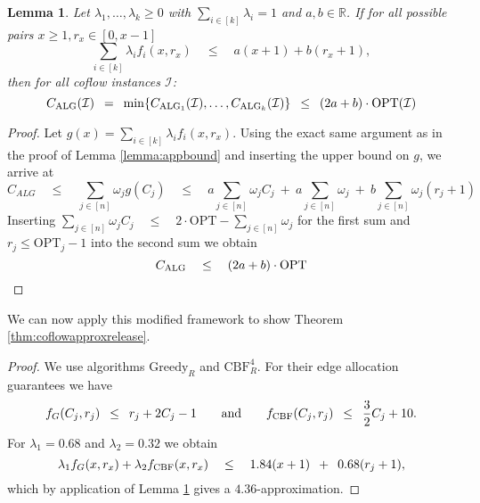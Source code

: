 \documentclass[11pt]{article}
\newcommand{\Hquad}{\hspace{0.5em}}
\newtheorem{lemma}[theorem]{Lemma}
\begin{document}
\begin{lemma}\label{lemma:appboundrelease}
Let $\lambda_1,\dotsc,\lambda_k \ge 0$ with $\sum_{i \in [k]}\lambda_i = 1$ and $a,b \in \mathbb{R}$. If for all possible pairs $x \ge 1, r_x \in [0,x-1]$
\begin{equation*}
    \sum_{i \in [k]}\lambda_i f_i(x, r_x) \quad \le \quad a(x+1) + b(r_x+1),
\end{equation*}
then for all coflow instances $\mathcal{I}$:
\begin{equation*}
    C_{\mathrm{ALG}}(\mathcal{I}) \Hquad=\Hquad \min\{C_{\mathrm{ALG}_1}(\mathcal{I}),\dotsc,C_{\mathrm{ALG}_k}(\mathcal{I})\} \Hquad\le\Hquad (2a + b) \cdot \mathrm{OPT}(\mathcal{I})
\end{equation*}
\end{lemma}
\begin{proof}
Let $g(x) = \sum_{i \in [k]}\lambda_i f_i(x,r_x)$. Using the exact same argument as in the proof of Lemma \ref{lemma:appbound} and inserting the upper bound on $g$, we arrive at
\begin{equation*}
    C_{ALG} \quad \le \quad \sum_{j \in [n]}\omega_j g(C_j) \quad \le \quad a \sum_{j \in [n]}\omega_j C_j \ +\  a\sum_{j \in [n]}\omega_j \ +\  b \sum_{j \in [n]}\omega_j(r_j+1)
\end{equation*}
Inserting $\sum_{j \in [n]}\omega_j C_j \quad \le \quad 2 \cdot \mathrm{OPT} - \sum_{j \in [n]}\omega_j$ for the first sum and $r_j \le \mathrm{OPT}_j-1$ into the second sum we obtain
\begin{equation*}
C_{\mathrm{ALG}} \quad \le \quad (2a+b) \cdot \mathrm{OPT} \qedhere
\end{equation*}
\end{proof}
\noindent We can now apply this modified framework to show Theorem \ref{thm:coflowapproxrelease}.

\rsthmcoflowapproxrelease*
\begin{proof}
We use algorithms $\mathrm{Greedy}_R$ and $\mathrm{CBF}_R^4$. For their edge allocation guarantees we have
\begin{equation*}
    f_G(C_j, r_j) \Hquad\le\Hquad r_j + 2C_j - 1\qquad \text{and} \qquad f_{\mathrm{CBF}}(C_j, r_j) \Hquad\le\Hquad \frac{3}{2}C_j + 10.
\end{equation*}
For $\lambda_1 = 0.68$ and $\lambda_2 = 0.32$ we obtain
\begin{equation*}
    \lambda_1 f_G(x, r_x) + \lambda_2 f_{\mathrm{CBF}}(x, r_x) \quad\le\quad 1.84 (x+1) \Hquad+\Hquad 0.68(r_j+1),
\end{equation*}
which by application of Lemma \ref{lemma:appboundrelease} gives a $4.36$-approximation.
\end{proof}
\end{document}
